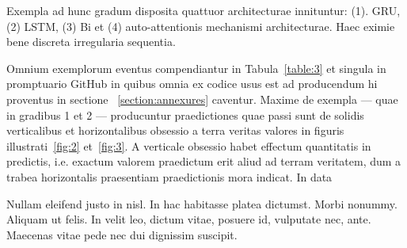 \documentclass[preprint,3p,times,twocolumn]{elsarticle}  %
\begin{document}
Exempla ad hunc gradum disposita quattuor architecturae innituntur: (1).
GRU, (2) LSTM, (3) Bi et (4) auto-attentionis mechanismi architecturae. Haec
eximie bene discreta irregularia sequentia.

  Omnium exemplorum eventus compendiantur in Tabula~\ref{table:3} et
singula in promptuario GitHub in quibus omnia ex codice usus est ad producendum
hi proventus in sectione ~\ref{section:annexures} caventur. Maxime de
exempla --- quae in gradibus 1 et 2 --- producuntur praedictiones quae passi sunt
de solidis verticalibus et horizontalibus obsessio a terra veritas
valores in figuris illustrati~\ref{fig:2} et~\ref{fig:3}. A verticale
obsessio habet effectum quantitatis in predictis, i.e. exactum valorem
praedictum erit aliud ad terram veritatem, dum a
trabea horizontalis praesentiam praedictionis mora indicat. In data

Nullam eleifend justo in nisl. In hac habitasse platea dictumst. Morbi nonummy.
 Aliquam ut felis. In velit leo, dictum vitae, posuere id, vulputate nec,
 ante. Maecenas vitae pede nec dui dignissim suscipit. %
\end{document}
